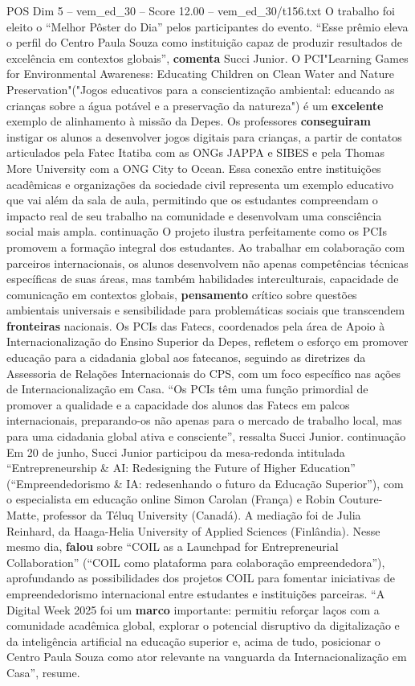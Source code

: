 \begin{textsample}{POS Dim 5 – vem\_ed\_30 – Score 12.00 – vem\_ed\_30/t156.txt}
O trabalho foi eleito o “Melhor Pôster do Dia” pelos participantes do evento. “Esse prêmio eleva o perfil do Centro Paula Souza como instituição capaz de produzir resultados de excelência em contextos globais”, \textbf{comenta} Succi Junior.
O PCI"Learning Games for Environmental Awareness: Educating Children on Clean Water and Nature Preservation"("Jogos educativos para a conscientização ambiental: educando as crianças sobre a água potável e a preservação da natureza") é um \textbf{excelente} exemplo de alinhamento à missão da Depes.
Os professores \textbf{conseguiram} instigar os alunos a desenvolver jogos digitais para crianças, a partir de contatos articulados pela Fatec Itatiba com as ONGs JAPPA e SIBES e pela Thomas More University com a ONG City to Ocean.
Essa conexão entre instituições acadêmicas e organizações da sociedade civil representa um exemplo educativo que vai além da sala de aula, permitindo que os estudantes compreendam o impacto real de seu trabalho na comunidade e desenvolvam uma consciência social mais ampla. continuação O projeto ilustra perfeitamente como os PCIs promovem a formação integral dos estudantes.
Ao trabalhar em colaboração com parceiros internacionais, os alunos desenvolvem não apenas competências técnicas específicas de suas áreas, mas também habilidades interculturais, capacidade de comunicação em contextos globais, \textbf{pensamento} crítico sobre questões ambientais universais e sensibilidade para problemáticas sociais que transcendem \textbf{fronteiras} nacionais.
Os PCIs das Fatecs, coordenados pela área de Apoio à Internacionalização do Ensino Superior da Depes, refletem o esforço em promover educação para a cidadania global aos fatecanos, seguindo as diretrizes da Assessoria de Relações Internacionais do CPS, com um foco específico nas ações de Internacionalização em Casa. “Os PCIs têm uma função primordial de promover a qualidade e a capacidade dos alunos das Fatecs em palcos internacionais, preparando-os não apenas para o mercado de trabalho local, mas para uma cidadania global ativa e consciente”, ressalta Succi Junior. continuação Em 20 de junho, Succi Junior participou da mesa-redonda intitulada “Entrepreneurship \& AI: Redesigning the Future of Higher Education” (“Empreendedorismo \& IA: redesenhando o futuro da Educação Superior”), com o especialista em educação online Simon Carolan (França) e Robin Couture-Matte, professor da Téluq University (Canadá).
A mediação foi de Julia Reinhard, da Haaga-Helia University of Applied Sciences (Finlândia).
Nesse mesmo dia, \textbf{falou} sobre “COIL as a Launchpad for Entrepreneurial Collaboration” (“COIL como plataforma para colaboração empreendedora”), aprofundando as possibilidades dos projetos COIL para fomentar iniciativas de empreendedorismo internacional entre estudantes e instituições parceiras. “A Digital Week 2025 foi um \textbf{marco} importante: permitiu reforçar laços com a comunidade acadêmica global, explorar o potencial disruptivo da digitalização e da inteligência artificial na educação superior e, acima de tudo, posicionar o Centro Paula Souza como ator relevante na vanguarda da Internacionalização em Casa”, resume.

\end{textsample}
